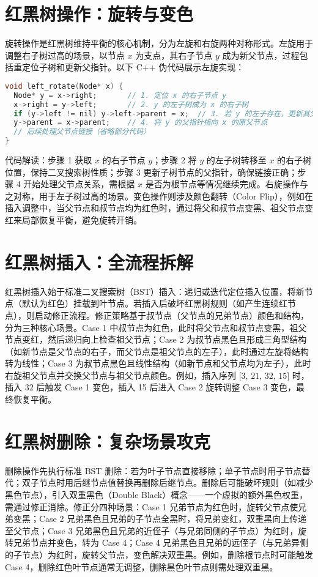 \chapter{红黑树操作：旋转与变色}
旋转操作是红黑树维持平衡的核心机制，分为左旋和右旋两种对称形式。左旋用于调整右子树过高的场景，以节点 $x$ 为支点，其右子节点 $y$ 成为新父节点，过程包括重定位子树和更新父指针。以下 C++ 伪代码展示左旋实现：\par
\begin{lstlisting}[language=cpp]
void left_rotate(Node* x) {
  Node* y = x->right;       // 1. 定位 x 的右子节点 y
  x->right = y->left;       // 2. y 的左子树成为 x 的右子树
  if (y->left != nil) y->left->parent = x;  // 3. 若 y 的左子存在，更新其父指针
  y->parent = x->parent;    // 4. 将 y 的父指针指向 x 的原父节点
  // 后续处理父节点链接（省略部分代码）
}
\end{lstlisting}
代码解读：步骤 1 获取 $x$ 的右子节点 $y$；步骤 2 将 $y$ 的左子树转移至 $x$ 的右子树位置，保持二叉搜索树性质；步骤 3 更新子树节点的父指针，确保链接正确；步骤 4 开始处理父节点关系，需根据 $x$ 是否为根节点等情况继续完成。右旋操作与之对称，用于左子树过高的场景。变色操作则涉及颜色翻转（Color Flip），例如在插入调整中，当父节点和叔节点均为红色时，通过将父和叔节点变黑、祖父节点变红来局部恢复平衡，避免旋转开销。\par
\chapter{红黑树插入：全流程拆解}
红黑树插入始于标准二叉搜索树（BST）插入：递归或迭代定位插入位置，将新节点（默认为红色）挂载到叶节点。若插入后破坏红黑树规则（如产生连续红节点），则启动修正流程。修正策略基于叔节点（父节点的兄弟节点）颜色和结构，分为三种核心场景。Case 1 中叔节点为红色，此时将父节点和叔节点变黑，祖父节点变红，然后递归向上检查祖父节点；Case 2 为叔节点黑色且形成三角型结构（如新节点是父节点的右子，而父节点是祖父节点的左子），此时通过左旋将结构转为线性；Case 3 为叔节点黑色且线性结构（如新节点和父节点均为左子），此时右旋祖父节点并交换父节点与祖父节点颜色。例如，插入序列 $[3$, $21$, $32$, $15]$ 时，插入 32 后触发 Case 1 变色，插入 15 后进入 Case 2 旋转调整 Case 3 变色，最终恢复平衡。\par
\chapter{红黑树删除：复杂场景攻克}
删除操作先执行标准 BST 删除：若为叶子节点直接移除；单子节点时用子节点替代；双子节点时用后继节点值替换再删除后继节点。删除后可能破坏规则（如减少黑色节点），引入双重黑色（Double Black）概念——一个虚拟的额外黑色权重，需通过修正消除。修正分四种场景：Case 1 兄弟节点为红色时，旋转父节点使兄弟变黑；Case 2 兄弟黑色且兄弟的子节点全黑时，将兄弟变红，双重黑向上传递至父节点；Case 3 兄弟黑色且兄弟的近侄子（与兄弟同侧的子节点）为红时，旋转兄弟节点并变色，转为 Case 4；Case 4 兄弟黑色且兄弟的远侄子（与兄弟异侧的子节点）为红时，旋转父节点，变色解决双重黑。例如，删除根节点时可能触发 Case 4，删除红色叶节点通常无调整，删除黑色叶节点则需处理双重黑。\par
